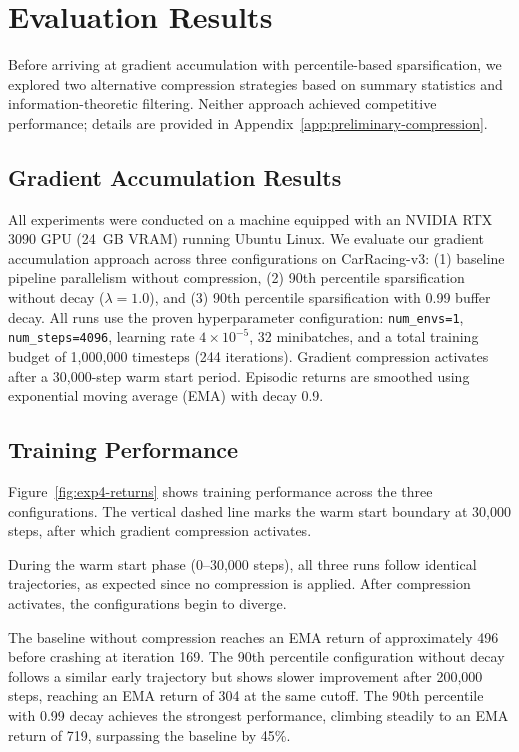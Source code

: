 \chapter{Evaluation Results}

Before arriving at gradient accumulation with percentile-based sparsification, we explored two alternative compression strategies based on summary statistics and information-theoretic filtering. Neither approach achieved competitive performance; details are provided in Appendix~\ref{app:preliminary-compression}.

\section{Gradient Accumulation Results}

All experiments were conducted on a machine equipped with an NVIDIA RTX 3090 GPU (24~GB VRAM) running Ubuntu Linux. We evaluate our gradient accumulation approach across three configurations on CarRacing-v3: (1) baseline pipeline parallelism without compression, (2) 90th percentile sparsification without decay ($\lambda = 1.0$), and (3) 90th percentile sparsification with 0.99 buffer decay. All runs use the proven hyperparameter configuration: \texttt{num\_envs=1}, \texttt{num\_steps=4096}, learning rate $4 \times 10^{-5}$, 32 minibatches, and a total training budget of 1,000,000 timesteps (244 iterations). Gradient compression activates after a 30,000-step warm start period. Episodic returns are smoothed using exponential moving average (EMA) with decay 0.9.

\section{Training Performance}

Figure~\ref{fig:exp4-returns} shows training performance across the three configurations. The vertical dashed line marks the warm start boundary at 30,000 steps, after which gradient compression activates.

During the warm start phase (0--30,000 steps), all three runs follow identical trajectories, as expected since no compression is applied. After compression activates, the configurations begin to diverge.

The baseline without compression reaches an EMA return of approximately 496 before crashing at iteration 169. The 90th percentile configuration without decay follows a similar early trajectory but shows slower improvement after 200,000 steps, reaching an EMA return of 304 at the same cutoff. The 90th percentile with 0.99 decay achieves the strongest performance, climbing steadily to an EMA return of 719, surpassing the baseline by 45\%.

